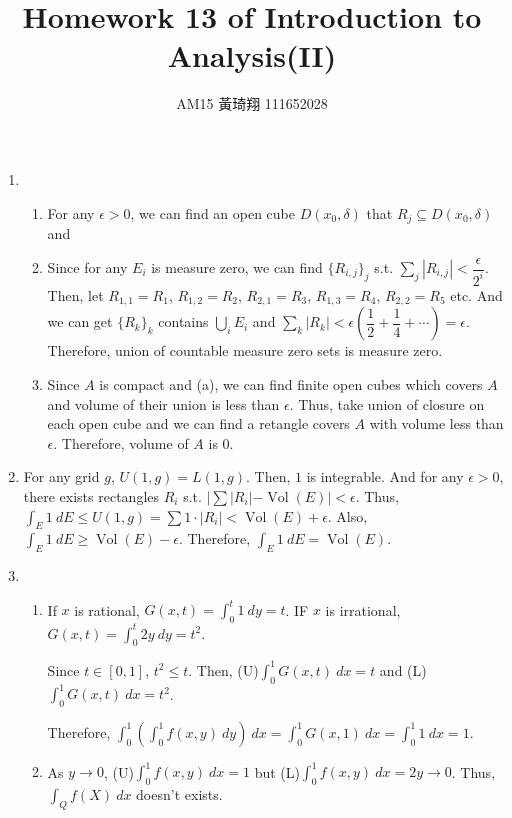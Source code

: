 \documentclass[12pt]{article}
\title{Homework 13 of Introduction to Analysis(II)}
\author{AM15 黃琦翔 111652028}
\DeclareMathOperator{\volume}{Vol}
\begin{document}
\maketitle
\begin{enumerate}
    \item \begin{enumerate}
        \item For any $\epsilon > 0$, 
        we can find an open cube $D(x_0, \delta)$ that $R_j \subseteq D(x_0, \delta)$ and 

        \item Since for any $E_i$ is measure zero, we can find $\{ R_{i, j}\}_j$ s.t. 
        $\displaystyle\sum_{j} |R_{i, j}| < \dfrac{\epsilon}{2^{i}}$.
        Then, let $R_{1, 1} = R_1$, $R_{1,2} = R_2$, $R_{2, 1} = R_3$, $R_{1, 3} = R_4$, $R_{2, 2} = R_5$ etc.
        And we can get $\{ R_k\}_k$ contains $\displaystyle\bigcup_i E_i$ and $\displaystyle\sum_{k} |R_k| < \epsilon(\dfrac{1}{2} + \dfrac{1}{4} + \cdots) = \epsilon$.
        Therefore, union of countable measure zero sets is measure zero.

        \item Since $A$ is compact and (a), we can find finite open cubes which covers $A$ and volume of their union is less than $\epsilon$.
        Thus, take union of closure on each open cube and we can find a retangle covers $A$ with volume less than $\epsilon$.
        Therefore, volume of $A$ is $0$.
    \end{enumerate}

    \item For any grid $g$, $U(1, g) = L(1, g)$. Then, $1$ is integrable.
    And for any $\epsilon > 0$, there exists rectangles $R_i$ s.t. $|\sum |R_i| - \volume(E)| <\epsilon$.
    Thus, $\displaystyle\int_E 1\ dE \leq U(1, g) = \sum 1 \cdot |R_i| < \volume(E) + \epsilon$.
    Also, $\displaystyle\int_E 1\ dE \geq \volume(E) - \epsilon$.
    Therefore, $\displaystyle\int_E 1\ dE = \volume(E)$.

    \item \begin{enumerate}
        \item If $x$ is rational, $G(x, t) = \displaystyle\int_{0}^{t} 1\ dy = t$.
        IF $x$ is irrational, $G(x, t) = \displaystyle\int_{0}^{t} 2y\ dy = t^2$.

        Since $t \in [0, 1]$, $t^2 \leq t$.
        Then, (U)$\displaystyle\int_{0}^{1} G(x, t)\ dx = t$ and (L)$\displaystyle\int_{0}^{1} G(x, t)\ dx = t^2$.

        Therefore, $\displaystyle\int_{0}^{1} (\displaystyle\int_{0}^{1} f(x, y)\ dy)\ dx = \displaystyle\int_{0}^{1} G(x, 1)\ dx = \displaystyle\int_{0}^{1} 1\ dx = 1$.

        \item As $y \to 0$, (U)$\displaystyle\int_{0}^{1} f(x, y)\ dx = 1$ but (L)$\displaystyle\int_{0}^{1} f(x, y)\ dx = 2y \to 0$.
        Thus, $\displaystyle\int_{Q} f(X)\ dx$ doesn't exists.
    \end{enumerate}
\end{enumerate}
\end{document}
